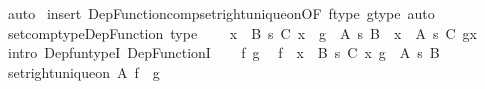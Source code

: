 \begin{isabellebody}
\ auto\isanewline
{}\isamarkupfalse%
\ {\isacharparenleft}{\kern0pt}insert\ Dep{\isacharunderscore}{\kern0pt}Function{\isacharunderscore}{\kern0pt}comp{\isacharunderscore}{\kern0pt}set{\isacharunderscore}{\kern0pt}right{\isacharunderscore}{\kern0pt}unique{\isacharunderscore}{\kern0pt}on{\isacharbrackleft}{\kern0pt}OF\ f{\isacharunderscore}{\kern0pt}type\ g{\isacharunderscore}{\kern0pt}type{\isacharbrackright}{\kern0pt}{\isacharcomma}{\kern0pt}\ auto{\isacharparenright}{\kern0pt}%
\endisatagproof
{\isafoldproof}%
%
\isadelimproof
\isanewline
%
\endisadelimproof
\isanewline
{}\isamarkupfalse%
\ set{\isacharunderscore}{\kern0pt}comp{\isacharunderscore}{\kern0pt}type{\isacharunderscore}{\kern0pt}Dep{\isacharunderscore}{\kern0pt}Function\ {\isacharbrackleft}{\kern0pt}type{\isacharbrackright}{\kern0pt}{\isacharcolon}{\kern0pt}\isanewline
\ \ {\isachardoublequoteopen}{\isacharparenleft}{\kern0pt}{\isasymcirc}{\isacharparenright}{\kern0pt}\ {\isacharcolon}{\kern0pt}\ {\isacharparenleft}{\kern0pt}{\isacharparenleft}{\kern0pt}x\ {\isacharcolon}{\kern0pt}\ B{\isacharparenright}{\kern0pt}\ {\isasymrightarrow}s\ C\ x{\isacharparenright}{\kern0pt}\ {\isasymRightarrow}\ {\isacharparenleft}{\kern0pt}g\ {\isacharcolon}{\kern0pt}\ A\ {\isasymrightarrow}s\ B{\isacharparenright}{\kern0pt}\ {\isasymRightarrow}\ {\isacharparenleft}{\kern0pt}x\ {\isacharcolon}{\kern0pt}\ A{\isacharparenright}{\kern0pt}\ {\isasymrightarrow}s\ C\ {\isacharparenleft}{\kern0pt}g{\isacharbackquote}{\kern0pt}x{\isacharparenright}{\kern0pt}{\isachardoublequoteclose}\isanewline
%
\isadelimproof
%
\endisadelimproof
%
\isatagproof
{}\isamarkupfalse%
\ {\isacharparenleft}{\kern0pt}intro\ Dep{\isacharunderscore}{\kern0pt}fun{\isacharunderscore}{\kern0pt}typeI\ Dep{\isacharunderscore}{\kern0pt}FunctionI{\isacharparenright}{\kern0pt}\isanewline
\ \ \isamarkupfalse%
\ f\ g\ \isamarkupfalse%
\ {\isachardoublequoteopen}f\ {\isacharcolon}{\kern0pt}\ {\isacharparenleft}{\kern0pt}x\ {\isacharcolon}{\kern0pt}\ B{\isacharparenright}{\kern0pt}\ {\isasymrightarrow}s\ C\ x{\isachardoublequoteclose}\ {\isachardoublequoteopen}g\ {\isacharcolon}{\kern0pt}\ A\ {\isasymrightarrow}s\ B{\isachardoublequoteclose}\isanewline
\ \ \isamarkupfalse%
\ \isamarkupfalse%
\ {\isachardoublequoteopen}set{\isacharunderscore}{\kern0pt}right{\isacharunderscore}{\kern0pt}unique{\isacharunderscore}{\kern0pt}on\ A\ {\isacharparenleft}{\kern0pt}f\ {\isasymcirc}\ g{\isacharparenright}{\kern0pt}{\isachardoublequoteclose}\isanewline

\end{isabellebody}
